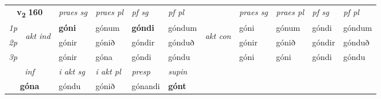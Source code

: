 \noindent
\begin{tabular}{lllllllllll} \toprule
\multicolumn{2}{c}{\textbf{v{\textsubscript{2}}} \Large{\textbf{160}}}  &  \textit{praes sg}  & \textit{praes pl}  &\textit{ pf sg} & \textit{pf pl} &  &  \textit{praes sg}  & \textit{praes pl}  & \textit{pf sg} & \textit{pf pl } \\*
	\cmidrule{3-6} \cmidrule{8-11}
 {\textit{1p}} & \multirow{3}{*}{\begin{turn}{90}\textit{akt ind}\end{turn}} & \textbf{góni} & gónum & \textbf{góndi} & góndum & \multirow{3}{*}{\begin{turn}{90}\textit{akt con}\end{turn}} &góni & gónum & góndi & góndum\\*
 {\textit{2p}} &  &  gónir  & gónið & góndir & gónduð & & gónir & gónið & góndir & gónduð \\*
{\textit{3p}} &  & gónir & góna & góndi & góndu & & góni & góni& góndi & góndu \\*
\cmidrule{3-6} \cmidrule{8-11}

   \multicolumn{2}{c}{\textit{inf}}  & \textit{i akt sg} & \textit{i akt pl}   & \textit{presp} & \textit{supin}   \\*
  \multicolumn{2}{c}{\textbf{góna}} & góndu  & gónið   & gónandi &  \textbf{gónt}   \\*
\end{tabular}

